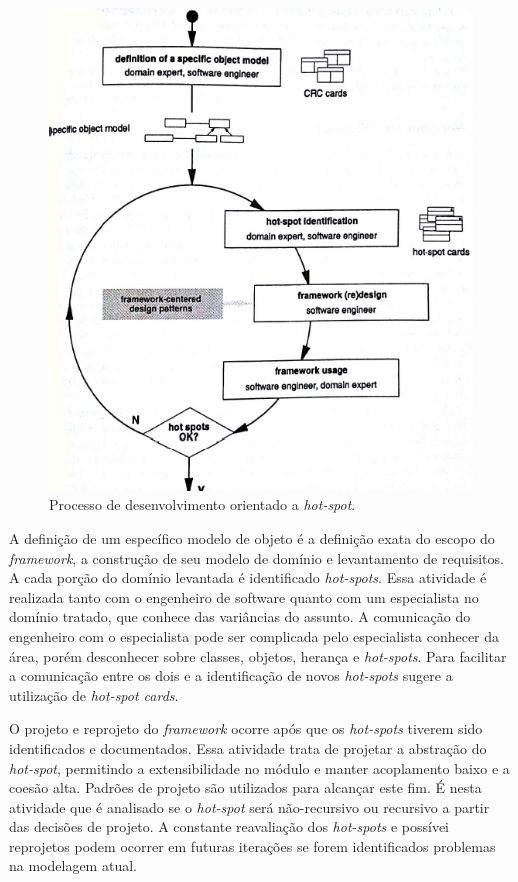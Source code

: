 \begin{figure}[h]
	\centering
	\label{fig15}
		\includegraphics[keepaspectratio=true,scale=0.4]{figuras/hotspotdd.jpg}
	\caption{Processo de desenvolvimento orientado a \textit{hot-spot}. \cite{Fayad1999}}
\end{figure}

A definição de um específico modelo de objeto é a definição exata do escopo do \textit{framework}, a construção de seu modelo de domínio e levantamento de requisitos. A cada porção do domínio levantada é identificado \textit{hot-spots}. Essa atividade é realizada tanto com o engenheiro de software quanto com um especialista no domínio tratado, que conhece das variâncias do assunto. A comunicação do engenheiro com o especialista pode ser complicada pelo especialista conhecer da área, porém desconhecer sobre classes, objetos, herança e \textit{hot-spots}. Para facilitar a comunicação entre os dois e a identificação de novos \textit{hot-spots} \cite{Fayad1999} sugere a utilização de \textit{hot-spot cards}.

O projeto e reprojeto do \textit{framework} ocorre após que os \textit{hot-spots} tiverem sido identificados e documentados. Essa atividade trata de projetar a abstração do \textit{hot-spot}, permitindo a extensibilidade no módulo e manter acoplamento baixo e a coesão alta. Padrões de projeto são utilizados para alcançar este fim. É nesta atividade que é analisado se o \textit{hot-spot} será não-recursivo ou recursivo a partir das decisões de projeto. A constante reavaliação dos \textit{hot-spots} e possívei reprojetos podem ocorrer em futuras iterações se forem identificados problemas na modelagem atual.

